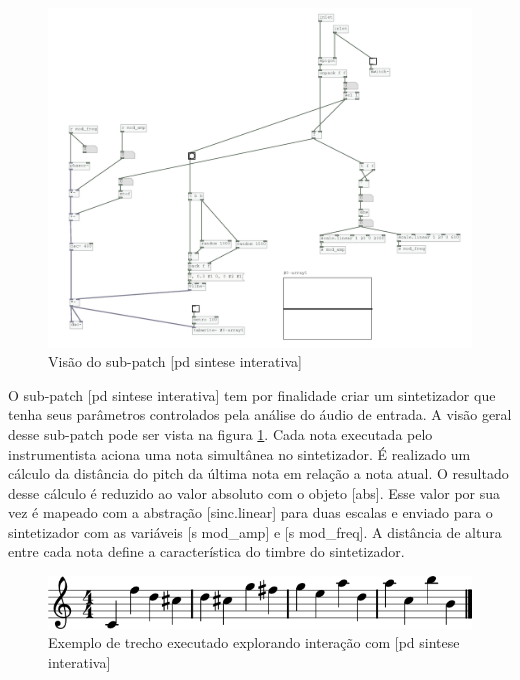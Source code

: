 \documentclass{ppgmus}
\begin{document}
\begin{figure}
\includegraphics[scale=.5]{sintese}
\caption{Visão do sub-patch [pd sintese interativa]}
\label{sintese}
\end{figure}

O sub-patch [pd sintese interativa] tem por finalidade criar um sintetizador que tenha
seus parâmetros controlados pela análise do áudio de entrada. A visão geral desse sub-patch pode
ser vista na figura \ref{sintese}.
Cada nota executada pelo
instrumentista aciona uma nota simultânea no sintetizador. É realizado um cálculo da distância
do pitch da última nota em relação a nota atual. O resultado desse cálculo é reduzido ao valor
absoluto com o objeto [abs]. Esse valor por sua vez é mapeado com a abstração [sinc.linear] para
duas escalas e enviado para o sintetizador com as variáveis [s mod\_amp] e [s mod\_freq].
A distância de altura entre cada nota define a característica do timbre do sintetizador.



\begin{figure}
\includegraphics[scale=.6]{part1}
\caption{Exemplo de trecho executado explorando interação com [pd sintese interativa]}
\label{part1}
\end{figure}
\end{document}
